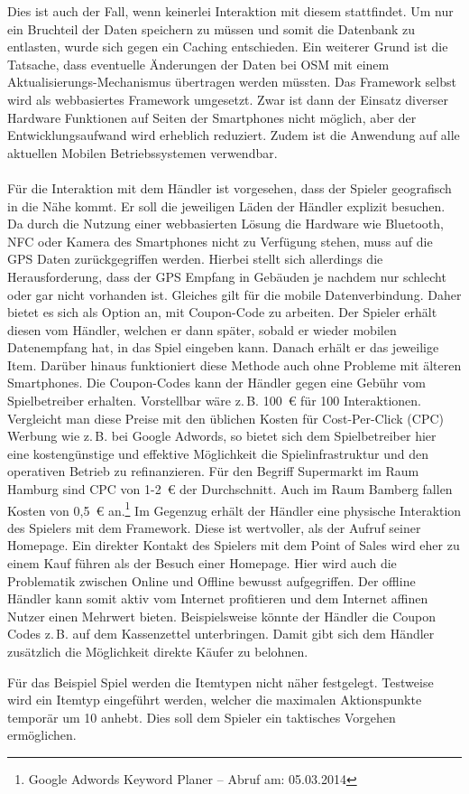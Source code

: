 Dies ist auch der Fall, wenn keinerlei Interaktion mit diesem stattfindet. Um nur ein Bruchteil der Daten speichern zu müssen und somit die Datenbank zu entlasten, wurde sich gegen ein Caching entschieden. Ein weiterer Grund ist die Tatsache, dass eventuelle Änderungen der Daten bei OSM mit einem Aktualisierungs-Mechanismus übertragen werden müssten.
Das Framework selbst wird als webbasiertes Framework umgesetzt.
Zwar ist dann der Einsatz diverser Hardware Funktionen auf Seiten der Smartphones nicht möglich, aber der Entwicklungsaufwand wird erheblich reduziert. Zudem ist die Anwendung auf alle aktuellen Mobilen Betriebssystemen verwendbar.
\\\\
Für die Interaktion mit dem Händler ist vorgesehen, dass der Spieler geografisch in die Nähe kommt. Er soll die jeweiligen Läden der Händler explizit besuchen. Da durch die Nutzung einer webbasierten Lösung die Hardware wie Bluetooth, NFC oder Kamera des Smartphones nicht zu Verfügung stehen, muss auf die GPS Daten zurückgegriffen werden.
Hierbei stellt sich allerdings die Herausforderung, dass der GPS Empfang in Gebäuden je nachdem nur schlecht oder gar nicht vorhanden ist.
Gleiches gilt für die mobile Datenverbindung. Daher bietet es sich als Option an, mit Coupon-Code zu arbeiten.
Der Spieler erhält diesen vom Händler, welchen er dann später, sobald er wieder mobilen Datenempfang hat, in das Spiel eingeben kann. Danach erhält er das jeweilige Item.
Darüber hinaus funktioniert diese Methode auch ohne Probleme mit älteren Smartphones. Die Coupon-Codes kann der Händler gegen eine Gebühr vom Spielbetreiber erhalten. Vorstellbar wäre z.\,B. 100~€ für 100 Interaktionen.
Vergleicht man diese Preise mit den üblichen Kosten für Cost-Per-Click (CPC) Werbung wie z.\,B. bei Google Adwords, so bietet sich dem Spielbetreiber hier eine kostengünstige und effektive Möglichkeit die Spielinfrastruktur und den operativen Betrieb zu refinanzieren.\cite{Guerini.2010}
Für den Begriff Supermarkt im Raum Hamburg sind CPC von 1-2~€ der Durchschnitt. Auch im Raum Bamberg fallen Kosten von 0,5~€ an.\footnote{Google Adwords Keyword Planer -- Abruf am: 05.03.2014} Im Gegenzug erhält der Händler eine physische Interaktion des Spielers mit dem Framework. Diese ist wertvoller, als der Aufruf seiner Homepage. Ein direkter Kontakt des Spielers mit dem Point of Sales wird eher zu einem Kauf führen als der Besuch einer Homepage. Hier wird auch die Problematik zwischen Online und Offline bewusst aufgegriffen. Der offline Händler kann somit aktiv vom Internet profitieren und dem Internet affinen Nutzer einen Mehrwert bieten. Beispielsweise könnte  der Händler die Coupon Codes z.\,B. auf dem Kassenzettel unterbringen. Damit gibt sich dem Händler zusätzlich die Möglichkeit direkte Käufer zu belohnen.

Für das Beispiel Spiel werden die Itemtypen nicht näher festgelegt. Testweise wird ein Itemtyp eingeführt werden, welcher die maximalen Aktionspunkte temporär um 10 anhebt. Dies soll dem Spieler ein taktisches Vorgehen ermöglichen.
